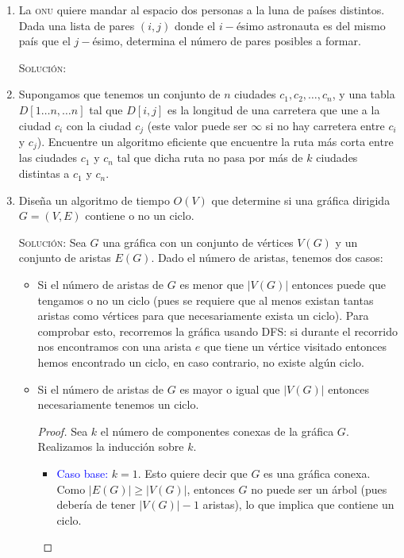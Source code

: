 \documentclass[letterpaper,11pt]{article}
\begin{document}
\begin{enumerate}
    \item La \textsc{onu} quiere mandar al espacio dos personas a la luna de
    países distintos. Dada una lista de pares $(i, j)$ donde el $i-$ésimo 
    astronauta es del mismo país que el $j-$ésimo, determina el número de 
    pares posibles a formar. 

    \textsc{Solución:}

    \item Supongamos que tenemos un conjunto de $n$ ciudades $c_1, c_2, \ldots,
    c_n$, y una tabla $D[1 \ldots n,  \ldots n]$ tal que $D[i,j]$ es la longitud 
    de una carretera que une a la ciudad $c_i$ con la ciudad $c_j$ (este valor 
    puede ser $\infty$ si no hay carretera entre $c_i$ y $c_j$). Encuentre un 
    algoritmo eficiente que encuentre la ruta más corta entre las ciudades $c_1$
    y $c_n$ tal que dicha ruta no pasa por más de $k$ ciudades distintas a 
    $c_1$ y $c_n$.

    \item Diseña un algoritmo de tiempo $O(V)$ que determine si una gráfica 
    dirigida $G = (V, E)$ contiene o no un ciclo.

    \textsc{Solución:} Sea $G$ una gráfica con un conjunto de vértices $V(G)$ y 
    un conjunto de aristas $E(G)$. Dado el número de aristas, tenemos dos casos:
    \begin{itemize}
        \item Si el número de aristas de $G$ es menor que $|V(G)|$ entonces puede 
        que tengamos o no un ciclo (pues se requiere que al menos existan tantas
        aristas como vértices para que necesariamente exista un ciclo). Para 
        comprobar esto, recorremos la gráfica usando DFS: si durante el recorrido
        nos encontramos con una arista $e$ que tiene un vértice visitado entonces
        hemos encontrado un ciclo, en caso contrario, no existe algún ciclo. 

        \item Si el número de aristas de $G$ es mayor o igual que $|V(G)|$
        entonces necesariamente tenemos un ciclo.
        \begin{proof}
            Sea $k$ el número de componentes conexas de la gráfica $G$. 
            Realizamos la inducción sobre $k$.
            \begin{itemize}
                \item \textcolor{blue}{Caso base:} $k=1$. Esto quiere decir que 
                $G$ es una gráfica conexa. Como $|E(G)| \geq |V(G)|$, entonces 
                $G$ no puede ser un árbol (pues debería de tener $|V(G)|-1$ 
                aristas), lo que implica que contiene un ciclo.
                

\end{itemize}
\end{proof}
\end{itemize}
\end{enumerate}
\end{document}

